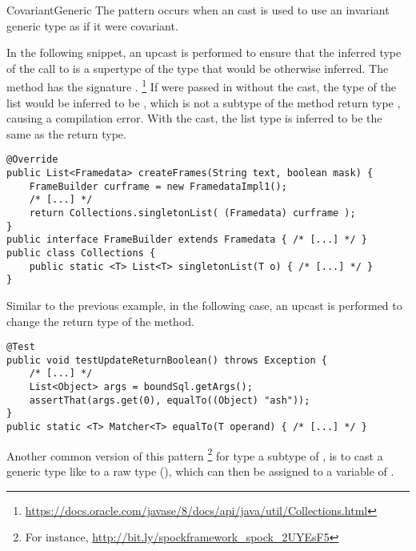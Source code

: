 \begin{pattern}{CovariantGeneric}
The \thisp{} pattern occurs when an cast is used to use an invariant generic type as if it were covariant.

\instances{}
In the following snippet,%
\def\urlvar{http://bit.ly/arpruss_raspberryjammod_2USL7Ai}
an upcast is performed to ensure that the inferred type of the call to  is a supertype of the type that would be otherwise inferred.
The  method has the signature .%
\footnote{\url{https://docs.oracle.com/javase/8/docs/api/java/util/Collections.html}}
If  were passed in without the cast,
the type of the list would be inferred to be ,
which is not a subtype of the method return type ,
causing a compilation error.
With the cast, the list type is inferred to be the same as the return type.

\begin{verbatim}
@Override
public List<Framedata> createFrames(String text, boolean mask) {
    FrameBuilder curframe = new FramedataImpl1();
    /* [...] */
    return Collections.singletonList( (Framedata) curframe );
}
public interface FrameBuilder extends Framedata { /* [...] */ }
public class Collections {
    public static <T> List<T> singletonList(T o) { /* [...] */ }
}
\end{verbatim}

Similar to the previous example,
in the following case,%
\def\urlvar{http://bit.ly/jfaster_mango_2EhXzUW}
an upcast is performed to change the return type of the  method.

\begin{verbatim}
@Test
public void testUpdateReturnBoolean() throws Exception {
    /* [...] */
    List<Object> args = boundSql.getArgs();
    assertThat(args.get(0), equalTo((Object) "ash"));
}
public static <T> Matcher<T> equalTo(T operand) { /* [...] */ }
\end{verbatim}

Another common version of this pattern%
\footnote{For instance, \url{http://bit.ly/spockframework_spock_2UYEsF5}}
for type  a subtype of ,
is to cast a generic type like  to a raw type (),
which can then be assigned to a variable of .


\end{pattern}
